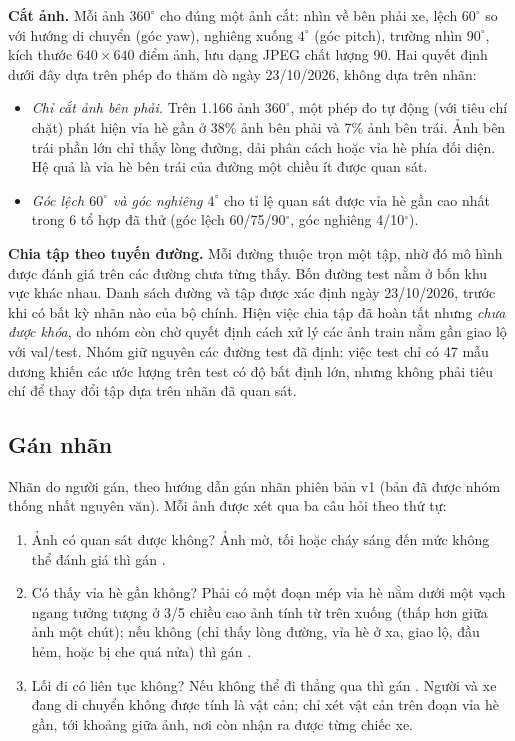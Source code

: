 \textbf{Cắt ảnh.} Mỗi ảnh $360^\circ$ cho đúng một ảnh cắt: nhìn về bên phải xe, lệch $60^\circ$ so với hướng di chuyển (góc yaw), nghiêng xuống $4^\circ$ (góc pitch), trường nhìn $90^\circ$, kích thước $640\times640$ điểm ảnh, lưu dạng JPEG chất lượng 90. Hai quyết định dưới đây dựa trên phép đo thăm dò ngày 23/10/2026, không dựa trên nhãn:
\begin{itemize}
  \item \emph{Chỉ cắt ảnh bên phải.} Trên 1.166 ảnh $360^\circ$, một phép đo tự động (với tiêu chí chặt) phát hiện vỉa hè gần ở 38\% ảnh bên phải và 7\% ảnh bên trái. Ảnh bên trái phần lớn chỉ thấy lòng đường, dải phân cách hoặc vỉa hè phía đối diện. Hệ quả là vỉa hè bên trái của đường một chiều ít được quan sát.
  \item \emph{Góc lệch $60^\circ$ và góc nghiêng $4^\circ$} cho tỉ lệ quan sát được vỉa hè gần cao nhất trong 6 tổ hợp đã thử (góc lệch 60/75/90$^\circ$, góc nghiêng 4/10$^\circ$).
\end{itemize}

\textbf{Chia tập theo tuyến đường.} Mỗi đường thuộc trọn một tập, nhờ đó mô hình được đánh giá trên các đường chưa từng thấy. Bốn đường test nằm ở bốn khu vực khác nhau. Danh sách đường và tập được xác định ngày 23/10/2026, trước khi có bất kỳ nhãn nào của bộ chính. Hiện việc chia tập đã hoàn tất nhưng \emph{chưa được khóa}, do nhóm còn chờ quyết định cách xử lý các ảnh train nằm gần giao lộ với val/test. Nhóm giữ nguyên các đường test đã định: việc test chỉ có 47 mẫu dương khiến các ước lượng trên test có độ bất định lớn, nhưng không phải tiêu chí để thay đổi tập dựa trên nhãn đã quan sát.

\subsection{Gán nhãn}
\label{sec:labeling}

Nhãn do người gán, theo hướng dẫn gán nhãn phiên bản v1 (bản đã được nhóm thống nhất nguyên văn). Mỗi ảnh được xét qua ba câu hỏi theo thứ tự:
\begin{enumerate}
  \item Ảnh có quan sát được không? Ảnh mờ, tối hoặc cháy sáng đến mức không thể đánh giá thì gán .
  \item Có thấy vỉa hè gần không? Phải có một đoạn mép vỉa hè nằm dưới một vạch ngang tưởng tượng ở 3/5 chiều cao ảnh tính từ trên xuống (thấp hơn giữa ảnh một chút); nếu không (chỉ thấy lòng đường, vỉa hè ở xa, giao lộ, đầu hẻm, hoặc bị che quá nửa) thì gán .
  \item Lối đi có liên tục không? Nếu không thể đi thẳng qua thì gán . Người và xe đang di chuyển không được tính là vật cản; chỉ xét vật cản trên đoạn vỉa hè gần, tới khoảng giữa ảnh, nơi còn nhận ra được từng chiếc xe.
\end{enumerate}

